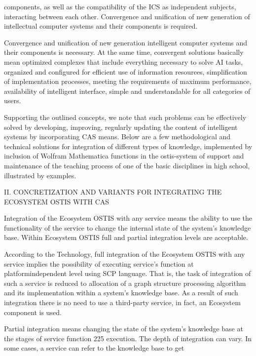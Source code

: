 \documentclass{article}
\begin{document}
\begin{multicols}{2}
components, as well as the compatibility of the ICS
as independent subjects, interacting between each other.
Convergence and unification of new generation of intellectual computer systems and their components is
required.
\par Convergence and unification of new generation intelligent computer systems and their components is necessary. At the same time, convergent solutions basically
mean optimized complexes that include everything necessary to solve AI tasks, organized and configured for
efficient use of information resources, simplification of
implementation processes, meeting the requirements of
maximum performance, availability of intelligent interface, simple and understandable for all categories of
users.
\par Supporting the outlined concepts, we note that such
problems can be effectively solved by developing, improving, regularly updating the content of intelligent
systems by incorporating CAS means. Below are a few
methodological and technical solutions for integration of
different types of knowledge, implemented by inclusion
of Wolfram Mathematica functions in the ostis-system
of support and maintenance of the teaching process of
one of the basic disciplines in high school, illustrated by
examples.
\begin{center}
    II. CONCRETIZATION AND VARIANTS FOR
INTEGRATING THE ECOSYSTEM OSTIS WITH CAS \\
\end{center}
\par Integration of the Ecosystem OSTIS with any service
means the ability to use the functionality of the service to
change the internal state of the system’s knowledge base.
Within Ecosystem OSTIS full and partial integration
levels are acceptable.
\par According to the Technology, full integration of the
Ecosystem OSTIS with any service implies the possibility of executing service’s function at platformindependent level using SCP language. That is, the task
of integration of such a service is reduced to allocation
of a graph structure processing algorithm and its implementation within a system’s knowledge base. As a result
of such integration there is no need to use a third-party
service, in fact, an Ecosystem component is used.
\par Partial integration means changing the state of the
system’s knowledge base at the stages of service function
225 execution. The depth of integration can vary. In some
cases, a service can refer to the knowledge base to get

\end{multicols}
\end{document}
